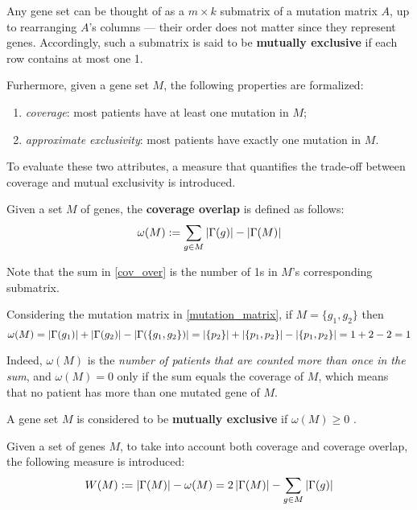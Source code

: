 Any gene set can be thought of as a $m \times k$ submatrix of a mutation matrix $A$, up to rearranging $A$'s columns --- their order does not matter since they represent genes. Accordingly, such a submatrix is said to be \textbf{mutually exclusive} if each row contains at most one 1.

Furhermore, given a gene set $M$, the following properties are formalized:

\begin{enumerate}[label=\roman*), font=\itshape]
    \item \textit{coverage}: most patients have at least one mutation in $M$;
    \item \textit{approximate exclusivity}: most patients have exactly one mutation in $M$.
\end{enumerate}

To evaluate these two attributes, a measure that quantifies the trade-off between coverage and mutual exclusivity is introduced.

\begin{definition} \label{cov_over}
    Given a set $M$ of genes, the \textbf{coverage overlap} is defined as follows: $$\omega(M) := \sum_{g \in M}{\left|\Gamma(g)\right|} - \left|\Gamma(M)\right|$$
\end{definition}

Note that the sum in \cref{cov_over} is the number of 1s in $M$'s corresponding submatrix.

\begin{example}
    Considering the mutation matrix in \cref{mutation_matrix}, if $M=\{g_1, g_2\}$ then $$\omega(M)=\left|\Gamma(g_1)\right| + \left|\Gamma(g_2)\right| - \left|\Gamma(\{g_1, g_2\})\right| = \left|\{p_2\}\right| + \left|\{p_1, p_2\}\right| - \left|\{p_1, p_2\}\right| = 1 + 2 - 2 = 1$$
\end{example}

Indeed, $\omega(M)$ is the \textit{number of patients that are counted more than once in the sum}, and $\omega(M) = 0$ only if the sum equals the coverage of $M$, which means that no patient has more than one mutated gene of $M$.

\begin{definition}
    A gene set $M$ is considered to be \textbf{mutually exclusive} if $\omega(M) \ge 0$ .
\end{definition}

\begin{definition} \label{weight}
    Given a set of genes $M$, to take into account both coverage and coverage overlap, the following measure is introduced: $$W(M): = \left|\Gamma(M)\right| - \omega(M) = 2 \left|\Gamma(M)\right| - \sum_{g \in M} {\left|\Gamma(g)\right|}$$
\end{definition}

